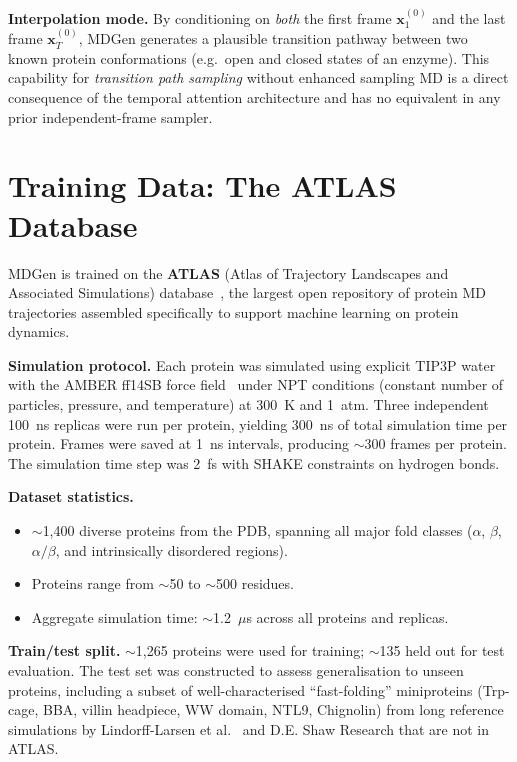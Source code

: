\documentclass[11pt,a4paper]{article}
\newcommand{\bx}{\mathbf{x}}
\begin{document}
\textbf{Interpolation mode.}  By conditioning on \emph{both} the first frame $\bx_1^{(0)}$ and
the last frame $\bx_T^{(0)}$, MDGen generates a plausible transition pathway between two known
protein conformations (e.g.\ open and closed states of an enzyme).  This capability for
\emph{transition path sampling} without enhanced sampling MD is a direct consequence of the
temporal attention architecture and has no equivalent in any prior independent-frame sampler.


\section{Training Data: The ATLAS Database}
\label{sec:data}

MDGen is trained on the \textbf{ATLAS} (Atlas of Trajectory Landscapes and Associated
Simulations) database~\cite{vandermeersche2024}, the largest open repository of protein MD
trajectories assembled specifically to support machine learning on protein dynamics.

\textbf{Simulation protocol.}
Each protein was simulated using explicit TIP3P water~\cite{jorgensen1983} with the AMBER
ff14SB force field~\cite{maier2015} under NPT conditions (constant number of particles, pressure,
and temperature) at 300~K and 1~atm.  Three independent 100~ns replicas were run per protein,
yielding 300~ns of total simulation time per protein.  Frames were saved at 1~ns intervals,
producing $\sim$300 frames per protein.  The simulation time step was 2~fs with SHAKE constraints
on hydrogen bonds.

\textbf{Dataset statistics.}
\begin{itemize}[leftmargin=2em]
  \item $\sim$1,400 diverse proteins from the PDB, spanning all major fold classes ($\alpha$,
    $\beta$, $\alpha/\beta$, and intrinsically disordered regions).
  \item Proteins range from $\sim$50 to $\sim$500 residues.
  \item Aggregate simulation time: $\sim$1.2~$\mu$s across all proteins and replicas.
\end{itemize}

\textbf{Train/test split.}
$\sim$1,265 proteins were used for training; $\sim$135 held out for test evaluation.  The test
set was constructed to assess generalisation to unseen proteins, including a subset of
well-characterised ``fast-folding'' miniproteins (Trp-cage, BBA, villin headpiece, WW domain,
NTL9, Chignolin) from long reference simulations by Lindorff-Larsen et al.~\cite{lindorff2011}
and D.E. Shaw Research that are not in ATLAS.
\end{document}
